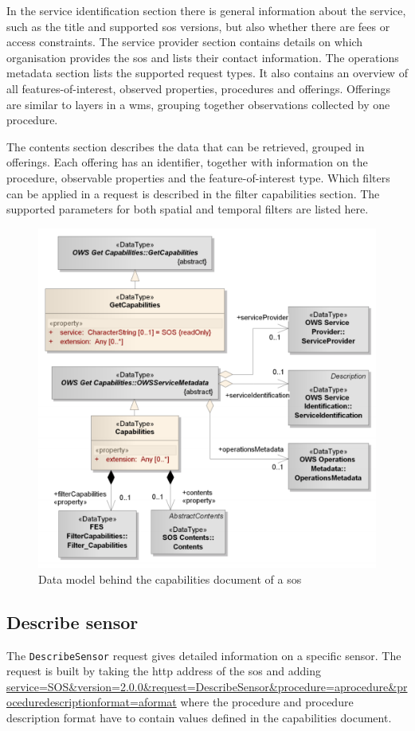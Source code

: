 In the service identification section there is general information about the service, such as the title and supported \ac{sos} versions, but also whether there are fees or access constraints. The service provider section contains details on which organisation provides the \ac{sos} and lists their contact information. The operations metadata section lists the supported request types. It also contains an overview of all features-of-interest, observed properties, procedures and offerings. Offerings are similar to layers in a \ac{wms}, grouping together observations collected by one procedure.

The contents section describes the data that can be retrieved, grouped in offerings. Each offering has an identifier, together with information on the procedure, observable properties and the feature-of-interest type. Which filters can be applied in a request is described in the filter capabilities section. The supported parameters for both spatial and temporal filters are listed here.

\begin{figure}
	\centering
	\includegraphics[width=0.7\linewidth]{figs/SOS_2_dataModel_GetCapabilities.PNG}
	\caption{Data model behind the capabilities document of a \ac{sos} \citep{SW:OGC2}}
	\label{fig:Capabilities}
\end{figure}

\subsection{Describe sensor}

\begin{sloppypar}
The \texttt{DescribeSensor} request gives detailed information on a specific sensor. The request is built by taking the \ac{http} address of the \ac{sos} and adding \url{service=SOS\&version=2.0.0\&request=DescribeSensor\&procedure=aprocedure\&proceduredescriptionformat=aformat} where the procedure and procedure description format have to contain values defined in the capabilities document.
\end{sloppypar}

